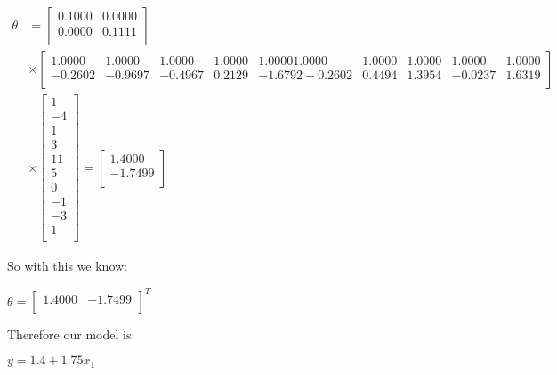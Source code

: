 \documentclass[12pt]{article}
\begin{document}
\begin{center}
\begin{align*}
        \theta &=
        \begin{bmatrix}
            0.1000 &  0.0000\\
            0.0000  &  0.1111\\
        \end{bmatrix} 
        \\
        &\times
        \begin{bmatrix}
            1.0000  &  1.0000 &   1.0000   & 1.0000  &  1.0000    1.0000  &  1.0000 &   1.0000   & 1.0000  &  1.0000 \\
            -0.2602 &   -0.9697  & -0.4967 &   0.2129 &  -1.6792   -0.2602  &  0.4494 &   1.3954  & -0.0237 &   1.6319 \\
        \end{bmatrix}
        \\
        &\times
        \begin{bmatrix}
            1\\
            -4\\
            1\\
            3\\
            11\\
            5\\
            0\\
            -1\\
            -3\\
            1\\
        \end{bmatrix}
        = 
        \begin{bmatrix}
            1.4000 \\
            - 1.7499 \\
        \end{bmatrix}
    \end{align*}
\end{center}

\noindent
So with this we know:
\begin{center}
    $
    \theta = 
    \begin{bmatrix}
        1.4000 & -1.7499 \\
    \end{bmatrix}
    ^{T}
    $
\end{center}

\noindent
Therefore our model is:

\begin{center}
    $
    y = 1.4 + 1.75x_{1}
    $
\end{center}
\newpage
\end{document}
